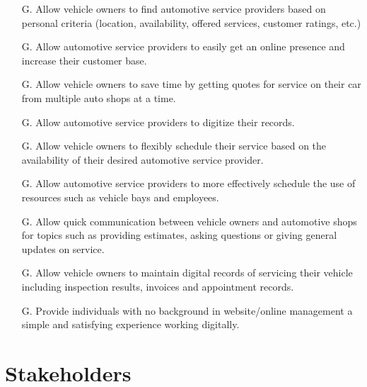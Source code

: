 \documentclass[12pt]{article}
\newcounter{goalnum} %
\begin{document}
    \begin{itemize}
        \item[G\refstepcounter{goalnum}\thegoalnum \label{R_Output}.] Allow vehicle owners to find automotive service providers based on personal criteria (location, availability, offered services, customer ratings, etc.)

        \item[G\refstepcounter{goalnum}\thegoalnum \label{R_Output}.] Allow automotive service providers to easily get an online presence and increase their customer base.

        \item[G\refstepcounter{goalnum}\thegoalnum \label{R_Output}.] Allow vehicle owners to save time by getting quotes for service on their car from multiple auto shops at a time.

        \item[G\refstepcounter{goalnum}\thegoalnum \label{R_Output}.] Allow automotive service providers to digitize their records.

        \item[G\refstepcounter{goalnum}\thegoalnum \label{R_Output}.] Allow vehicle owners to flexibly schedule their service based on the availability of their desired automotive service provider.

        \item[G\refstepcounter{goalnum}\thegoalnum \label{R_Output}.] Allow automotive service providers to more effectively schedule the use of resources such as vehicle bays and employees.

        \item[G\refstepcounter{goalnum}\thegoalnum \label{R_Output}.] Allow quick communication between vehicle owners and automotive shops for topics such as providing estimates, asking questions or giving general updates on service.

        \item[G\refstepcounter{goalnum}\thegoalnum \label{R_Output}.] Allow vehicle owners to maintain digital records of servicing their vehicle including inspection results, invoices and appointment records.

        \item[G\refstepcounter{goalnum}\thegoalnum \label{R_Output}.] Provide individuals with no background in website/online management a simple and satisfying experience working digitally.
    \end{itemize}

\section{Stakeholders}
\end{document}
